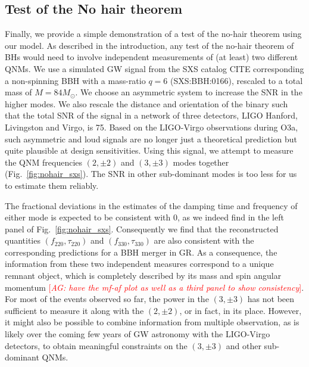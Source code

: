 \documentclass[twocolumn,prd,superscriptaddress,amsfonts,amssymb,amsmath,preprintnumbers]{revtex4-1}
\newcommand{\abhi}[1]{\textcolor{red}{[\textit{AG: #1}]}}
\newcommand{\Mo}{M_{\odot}}
\newcommand{\fngr}[1]{f_{\text{#1}}}
\newcommand{\taungr}[1]{\tau_{\text{#1}}}
\begin{document}
\subsection{Test of the No hair theorem}\label{ssec:nohairtheorem}

Finally, we provide a simple demonstration of a test of the no-hair theorem using our model. As described in the introduction, any test of the no-hair theorem of BHs would need to involve independent measurements of (at least) two different QNMs. We use a simulated GW signal from the SXS catalog CITE corresponding a non-spinning BBH with a mass-ratio $q=6$ (SXS:BBH:0166), rescaled to a total mass of $M=84 \Mo$. We choose an asymmetric system to increase the SNR in the higher modes. We also rescale the distance and orientation of the binary such that the total SNR of the signal in a network of three detectors, LIGO Hanford, Livingston and Virgo, is 75. Based on the LIGO-Virgo observations during O3a, such asymmetric and loud signals are no longer just a theoretical prediction but quite plausible at design sensitivities. Using this signal, we attempt to measure the QNM frequencies $(2,\pm 2)$ and $(3,\pm 3)$ modes together (Fig.~\ref{fig:nohair_sxs}). The SNR in other sub-dominant modes is too less for us to estimate them reliably.

The fractional deviations in the estimates of the damping time and frequency of either mode is expected to be consistent with 0, as we indeed find in the left panel of Fig.~\ref{fig:nohair_sxs}. Consequently we find that the reconstructed quantities $(\fngr{220}, \taungr{220})$ and $(\fngr{330}, \taungr{330})$  are also consistent with the corresponding predictions for a BBH merger in GR. As a consequence, the information from these two independent measures correspond to a unique remnant object, which is completely described by its mass and spin angular momentum \abhi{have the mf-af plot as well as a third panel to show consistency}. For most of the events observed so far, the power in the $(3,\pm 3)$ has not been sufficient to measure it along with the $(2,\pm 2)$, or in fact, in its place. However, it might also be possible to combine information from multiple observation, as is likely over the coming few years of GW astronomy with the LIGO-Virgo detectors, to obtain meaningful constraints on the $(3,\pm 3)$ and other sub-dominant QNMs.

\end{document}
